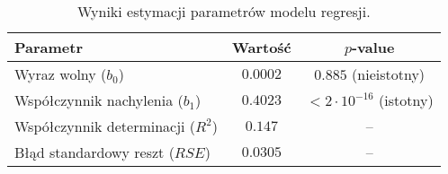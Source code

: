 \documentclass[12pt]{article}
\begin{document}
\begin{table}[H]
    \centering
    \begin{tabular}{l c c}
        \toprule
        \textbf{Parametr} & \textbf{Wartość} & \textbf{\(p\)-value} \\
        \midrule
        Wyraz wolny (\(b_0\)) & \(0.0002\) & \(0.885\) (nieistotny) \\
        Współczynnik nachylenia (\(b_1\)) & \(0.4023\) & \(< 2 \cdot 10^{-16}\) (istotny) \\
        Współczynnik determinacji (\(R^2\)) & \(0.147\) & -- \\
        Błąd standardowy reszt (\(RSE\)) & \(0.0305\) & -- \\
        \bottomrule
    \end{tabular}
    \caption{Wyniki estymacji parametrów modelu regresji.}
    \label{tab:regression_results}
\end{table}
\end{document}
